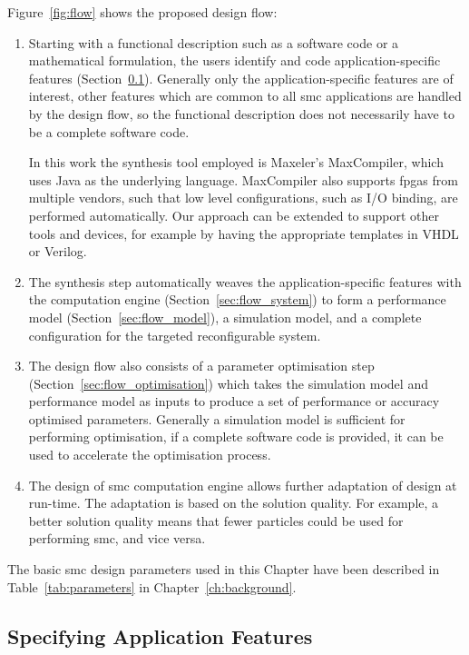 Figure~\ref{fig:flow} shows the proposed design flow:

\begin{enumerate}
\item Starting with a functional description such as a software code or a mathematical formulation, the users identify and code application-specific features (Section~\ref{sec:flow_kernel}). 
Generally only the application-specific features are of interest, other features which are common to all \gls{smc} applications are handled by the design flow, so the functional description does not necessarily have to be a complete software code.

In this work the synthesis tool employed is Maxeler's MaxCompiler, which uses Java as the underlying language. 
MaxCompiler also supports \glspl{fpga} from multiple vendors, such that low level configurations, such as I/O binding, are performed automatically.
Our approach can be extended to support other tools and devices, for example by having the appropriate templates in VHDL or Verilog.
\item The synthesis step automatically weaves the application-specific features with the computation engine (Section~\ref{sec:flow_system}) to form a performance model (Section~\ref{sec:flow_model}), a simulation model, and a complete configuration for the targeted reconfigurable system.
\item The design flow also consists of a parameter optimisation step (Section~\ref{sec:flow_optimisation}) which takes the simulation model and performance model as inputs to produce a set of performance or accuracy optimised parameters.
Generally a simulation model is sufficient for performing optimisation, if a complete software code is provided, it can be used to accelerate the optimisation process.
\item The design of \gls{smc} computation engine allows further adaptation of design at run-time.
The adaptation is based on the solution quality.
For example, a better solution quality means that fewer particles could be used for performing \gls{smc}, and vice versa.
\end{enumerate}

The basic \gls{smc} design parameters used in this Chapter have been described in Table~\ref{tab:parameters} in Chapter~\ref{ch:background}.


\subsection{Specifying Application Features}
\label{sec:flow_kernel}

